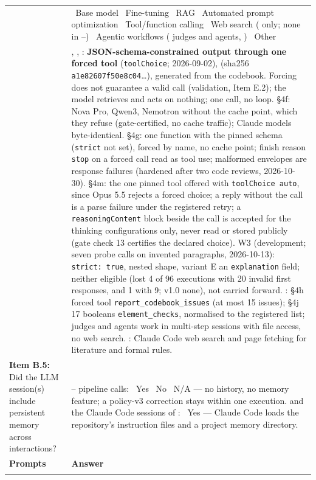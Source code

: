 \documentclass[12pt]{article}
\providecommand{\checked}{\ding{110}}   %
\providecommand{\unchecked}{\ding{111}} %
\begin{document}
{\begin{longtable}{|J|K|}
&
\checked~Base model \quad \unchecked~Fine-tuning \quad \unchecked~RAG \quad \unchecked~Automated prompt optimization \quad \checked~Tool/function calling \quad \checked~Web search ( only; none in --) \quad \checked~Agentic workflows ( judges and agents, ) \quad \unchecked~Other
\\[2pt]
& , , : \textbf{JSON-schema-constrained output through one forced tool} (\texttt{toolChoice}; 2026-09-02),  (sha256 \texttt{a1e82607f50e8c04}\ldots), generated from the codebook. Forcing does not guarantee a valid call (validation, Item E.2); the model retrieves and acts on nothing; one call, no loop. \S4f: Nova Pro, Qwen3, Nemotron without the cache point, which they refuse (gate-certified, no cache traffic); Claude models byte-identical. \S4g: one function with the pinned schema (\texttt{strict} not set), forced by name, no cache point; finish reason \texttt{stop} on a forced call read as tool use; malformed envelopes are response failures (hardened after two code reviews, 2026-10-30). \S4m: the one pinned tool offered with \texttt{toolChoice auto}, since Opus 5.5 rejects a forced choice; a reply without the call is a parse failure under the registered retry; a \texttt{reasoningContent} block beside the call is accepted for the thinking configurations only, never read or stored publicly (gate check 13 certifies the declared choice). W3 (development; seven probe calls on invented paragraphs, 2026-10-13): \texttt{strict: true}, nested shape, variant E an \texttt{explanation} field; neither eligible (lost 4 of 96 executions with 20 invalid first responses, and 1 with 9; v1.0 none), not carried forward. : \S4h forced tool \texttt{report\_codebook\_issues} (at most 15 issues); \S4j 17 booleans \texttt{element\_checks}, normalised to the registered list; judges and agents work in multi-step sessions with file access, no web search. : Claude Code web search and page fetching for literature and formal rules.
\\
\hline
\textbf{Item B.5:} Did the LLM session(s) include persistent memory across interactions?
&
-- pipeline calls: \unchecked~Yes \quad \checked~No \quad \unchecked~N/A --- no history, no memory feature; a policy-v3 correction stays within one execution.  and the Claude Code sessions of : \checked~Yes --- Claude Code loads the repository's instruction files and a project memory directory.
\\
\hline
{}
\textbf{Prompts} & \textbf{Answer} \\*


\end{longtable}}
\end{document}
